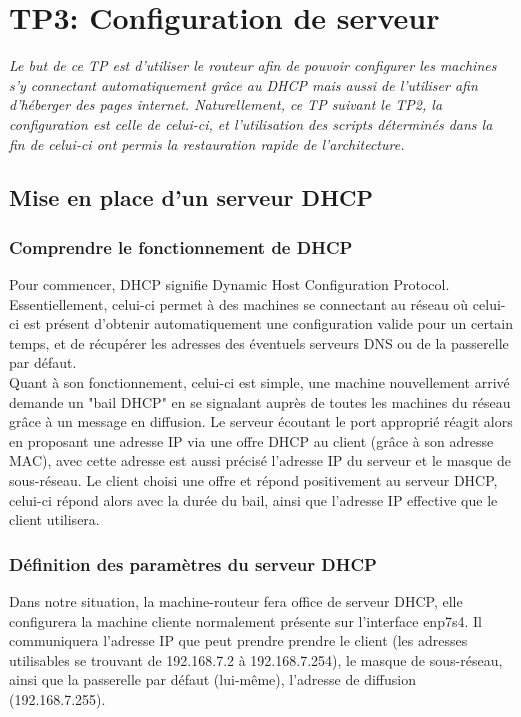 \chapter{TP3: Configuration de serveur}
\textit{Le but de ce TP est d'utiliser le routeur afin de pouvoir configurer les machines s'y connectant automatiquement grâce au DHCP mais aussi de l'utiliser afin d'héberger des pages internet. Naturellement, ce TP suivant le TP2, la configuration est celle de celui-ci, et l'utilisation des scripts déterminés dans la fin de celui-ci ont permis la restauration rapide de l'architecture.}

\section{Mise en place d’un serveur DHCP}
\subsection{Comprendre le fonctionnement de DHCP}
Pour commencer, DHCP signifie Dynamic Host Configuration Protocol. Essentiellement, celui-ci permet à des machines se connectant au réseau où celui-ci est présent d'obtenir automatiquement une configuration valide pour un certain temps, et de récupérer les adresses des éventuels serveurs DNS ou de la passerelle par défaut.\\
Quant à son fonctionnement, celui-ci est simple, une machine nouvellement arrivé demande un "bail DHCP" en se signalant auprès de toutes les machines du réseau grâce à un message en diffusion. Le serveur écoutant le port approprié réagit alors en proposant une adresse IP via une offre DHCP au client (grâce à son adresse MAC), avec cette adresse est aussi précisé l'adresse IP du serveur et le masque de sous-réseau. Le client choisi une offre et répond positivement au serveur DHCP, celui-ci répond alors avec la durée du bail, ainsi que l'adresse IP effective que le client utilisera.

\subsection{Définition des paramètres du serveur DHCP}
Dans notre situation, la machine-routeur fera office de serveur DHCP, elle configurera la machine cliente normalement présente sur l'interface enp7s4. Il communiquera l'adresse IP que peut prendre prendre le client (les adresses utilisables se trouvant de 192.168.7.2 à 192.168.7.254), le masque de sous-réseau, ainsi que la passerelle par défaut (lui-même), l'adresse de diffusion (192.168.7.255).

